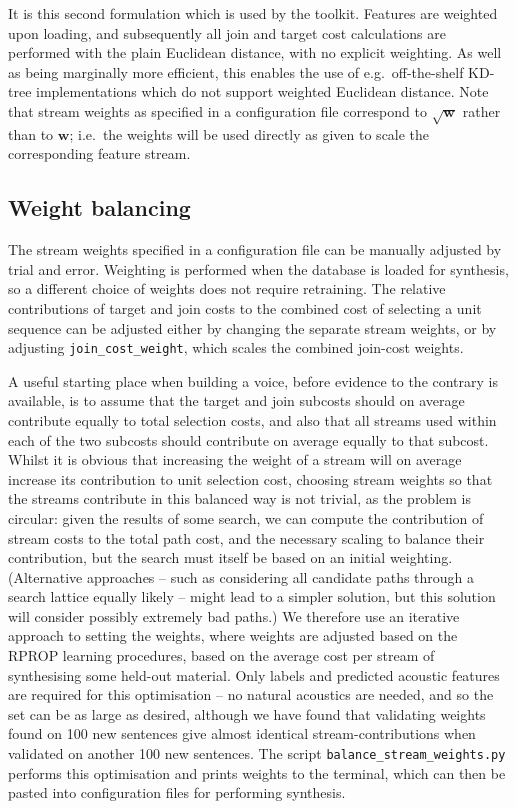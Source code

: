 \noindent It is this second formulation which is used by the toolkit.  Features are weighted upon loading, and subsequently all join and target cost calculations are performed with the plain Euclidean distance, with no explicit weighting. As well as being marginally more efficient, this enables the use of e.g.\ off-the-shelf KD-tree implementations which do not support weighted Euclidean distance. Note that stream weights as specified in a configuration file correspond to $\sqrt{\bm{w}}$ rather than to $\bm{w}$; i.e.\ the weights will be used directly as given to scale the corresponding feature stream.


\subsection{Weight balancing}

The stream weights specified in a configuration file can be manually adjusted by trial and error. Weighting is performed when the database is loaded for synthesis, so a different choice of weights does not require retraining. The relative contributions of target and join costs to the combined cost of selecting a unit sequence can be adjusted either by changing the separate stream weights, or by adjusting {\tt join\_cost\_weight}, which scales the combined join-cost weights.

A useful starting place when building a voice, before evidence to the contrary is available, is to assume that the target and join subcosts should on average contribute equally to total selection costs, and also that all streams used within each of the two subcosts should contribute on average equally to that subcost.
Whilst it is obvious that increasing the weight of a stream will on average increase its contribution to unit selection cost, choosing stream weights so that the streams contribute in this balanced way is not trivial, as the problem
is circular: given the results of some search, we can compute the contribution of stream costs to the
total path cost, and the necessary scaling to balance their contribution, but the search must itself be based on an initial weighting. (Alternative approaches -- such as considering all candidate paths through a search lattice equally likely -- might lead to a simpler solution, but this solution will consider possibly extremely bad paths.) We therefore use an iterative approach to setting the weights, where weights are adjusted based on the RPROP learning procedures, based on the average cost per stream of synthesising some held-out material. Only labels and predicted acoustic features are required for this optimisation -- no natural acoustics are needed, and so the set can be as large as desired, although we have found that validating weights found on 100 new sentences give almost identical stream-contributions when validated on another 100 new sentences. The script {\tt balance\_stream\_weights.py} performs this optimisation and prints weights to the terminal, which can then be pasted into configuration files for performing synthesis.

